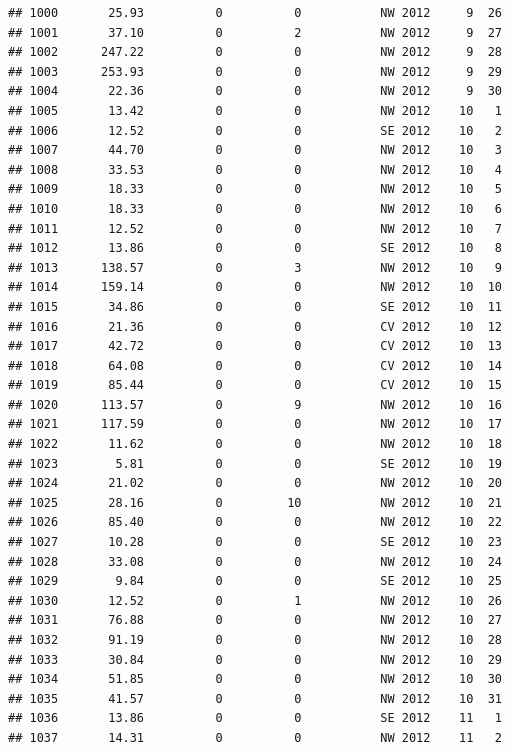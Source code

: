 \documentclass[
]{article}
\begin{document}
\begin{verbatim}
## 1000       25.93          0          0           NW 2012     9  26
## 1001       37.10          0          2           NW 2012     9  27
## 1002      247.22          0          0           NW 2012     9  28
## 1003      253.93          0          0           NW 2012     9  29
## 1004       22.36          0          0           NW 2012     9  30
## 1005       13.42          0          0           NW 2012    10   1
## 1006       12.52          0          0           SE 2012    10   2
## 1007       44.70          0          0           NW 2012    10   3
## 1008       33.53          0          0           NW 2012    10   4
## 1009       18.33          0          0           NW 2012    10   5
## 1010       18.33          0          0           NW 2012    10   6
## 1011       12.52          0          0           NW 2012    10   7
## 1012       13.86          0          0           SE 2012    10   8
## 1013      138.57          0          3           NW 2012    10   9
## 1014      159.14          0          0           NW 2012    10  10
## 1015       34.86          0          0           SE 2012    10  11
## 1016       21.36          0          0           CV 2012    10  12
## 1017       42.72          0          0           CV 2012    10  13
## 1018       64.08          0          0           CV 2012    10  14
## 1019       85.44          0          0           CV 2012    10  15
## 1020      113.57          0          9           NW 2012    10  16
## 1021      117.59          0          0           NW 2012    10  17
## 1022       11.62          0          0           NW 2012    10  18
## 1023        5.81          0          0           SE 2012    10  19
## 1024       21.02          0          0           NW 2012    10  20
## 1025       28.16          0         10           NW 2012    10  21
## 1026       85.40          0          0           NW 2012    10  22
## 1027       10.28          0          0           SE 2012    10  23
## 1028       33.08          0          0           NW 2012    10  24
## 1029        9.84          0          0           SE 2012    10  25
## 1030       12.52          0          1           NW 2012    10  26
## 1031       76.88          0          0           NW 2012    10  27
## 1032       91.19          0          0           NW 2012    10  28
## 1033       30.84          0          0           NW 2012    10  29
## 1034       51.85          0          0           NW 2012    10  30
## 1035       41.57          0          0           NW 2012    10  31
## 1036       13.86          0          0           SE 2012    11   1
## 1037       14.31          0          0           NW 2012    11   2

\end{verbatim}
\end{document}

